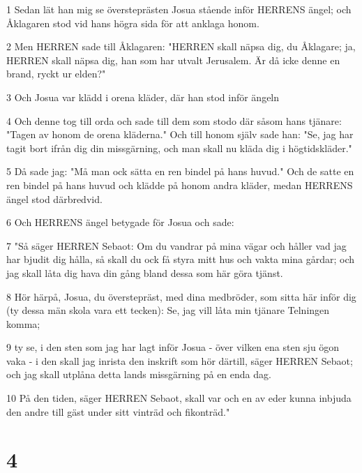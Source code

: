 \par 1 Sedan lät han mig se översteprästen Josua stående inför HERRENS ängel; och Åklagaren stod vid hans högra sida för att anklaga honom.
\par 2 Men HERREN sade till Åklagaren: "HERREN skall näpsa dig, du Åklagare; ja, HERREN skall näpsa dig, han som har utvalt Jerusalem. Är då icke denne en brand, ryckt ur elden?"
\par 3 Och Josua var klädd i orena kläder, där han stod inför ängeln
\par 4 Och denne tog till orda och sade till dem som stodo där såsom hans tjänare: "Tagen av honom de orena kläderna." Och till honom själv sade han: "Se, jag har tagit bort ifrån dig din missgärning, och man skall nu kläda dig i högtidskläder."
\par 5 Då sade jag: "Må man ock sätta en ren bindel på hans huvud." Och de satte en ren bindel på hans huvud och klädde på honom andra kläder, medan HERRENS ängel stod därbredvid.
\par 6 Och HERRENS ängel betygade för Josua och sade:
\par 7 "Så säger HERREN Sebaot: Om du vandrar på mina vägar och håller vad jag har bjudit dig hålla, så skall du ock få styra mitt hus och vakta mina gårdar; och jag skall låta dig hava din gång bland dessa som här göra tjänst.
\par 8 Hör härpå, Josua, du överstepräst, med dina medbröder, som sitta här inför dig (ty dessa män skola vara ett tecken): Se, jag vill låta min tjänare Telningen komma;
\par 9 ty se, i den sten som jag har lagt inför Josua - över vilken ena sten sju ögon vaka - i den skall jag inrista den inskrift som hör därtill, säger HERREN Sebaot; och jag skall utplåna detta lands missgärning på en enda dag.
\par 10 På den tiden, säger HERREN Sebaot, skall var och en av eder kunna inbjuda den andre till gäst under sitt vinträd och fikonträd."

\chapter{4}

